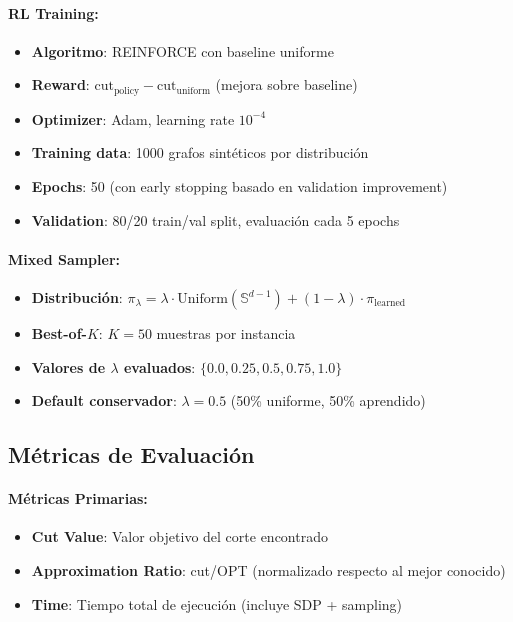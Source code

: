 \documentclass{article}
\begin{document}
\paragraph{RL Training:}
\begin{itemize}
    \item \textbf{Algoritmo}: REINFORCE con baseline uniforme
    \item \textbf{Reward}: $\text{cut}_{\text{policy}} - \text{cut}_{\text{uniform}}$ (mejora sobre baseline)
    \item \textbf{Optimizer}: Adam, learning rate $10^{-4}$
    \item \textbf{Training data}: 1000 grafos sintéticos por distribución
    \item \textbf{Epochs}: 50 (con early stopping basado en validation improvement)
    \item \textbf{Validation}: 80/20 train/val split, evaluación cada 5 epochs
\end{itemize}

\paragraph{Mixed Sampler:}
\begin{itemize}
    \item \textbf{Distribución}: $\pi_\lambda = \lambda \cdot \text{Uniform}(\mathbb{S}^{d-1}) + (1-\lambda) \cdot \pi_{\text{learned}}$
    \item \textbf{Best-of-$K$}: $K = 50$ muestras por instancia
    \item \textbf{Valores de $\lambda$ evaluados}: $\{0.0, 0.25, 0.5, 0.75, 1.0\}$
    \item \textbf{Default conservador}: $\lambda = 0.5$ (50\% uniforme, 50\% aprendido)
\end{itemize}

\subsection{Métricas de Evaluación}

\paragraph{Métricas Primarias:}
\begin{itemize}
    \item \textbf{Cut Value}: Valor objetivo del corte encontrado
    \item \textbf{Approximation Ratio}: cut/OPT (normalizado respecto al mejor conocido)
    \item \textbf{Time}: Tiempo total de ejecución (incluye SDP + sampling)
\end{itemize}
\end{document}
